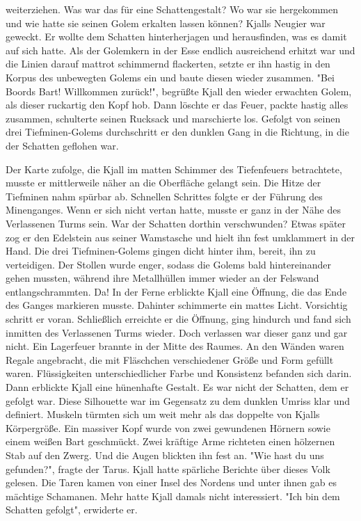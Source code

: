\documentclass[10pt, a4paper, oneside]{book}
\begin{document}
\begin{multicols}{2}
weiterziehen. Was war das für eine Schattengestalt? Wo war sie hergekommen und wie hatte sie seinen Golem erkalten lassen können? Kjalls Neugier war geweckt. Er wollte dem Schatten hinterherjagen und herausfinden, was es damit auf sich hatte. Als der Golemkern in der Esse endlich ausreichend erhitzt war und die Linien darauf mattrot schimmernd flackerten, setzte er ihn hastig in den Korpus des unbewegten Golems ein und baute diesen wieder zusammen. "Bei Boords Bart! Willkommen zurück!", begrüßte Kjall den wieder erwachten Golem, als dieser ruckartig den Kopf hob. Dann löschte er das Feuer, packte hastig alles zusammen, schulterte seinen Rucksack und marschierte los. Gefolgt von seinen drei Tiefminen-Golems durchschritt er den dunklen Gang in die Richtung, in die der Schatten geflohen war.\bigskip

Der Karte zufolge, die Kjall im matten Schimmer des Tiefenfeuers betrachtete, musste er mittlerweile näher an die Oberfläche gelangt sein. Die Hitze der Tiefminen nahm spürbar ab. Schnellen Schrittes folgte er der Führung des Minenganges. Wenn er sich nicht vertan hatte, musste er ganz in der Nähe des Verlassenen Turms sein. War der Schatten dorthin verschwunden? Etwas später zog er den Edelstein aus seiner Wamstasche und hielt ihn fest umklammert in der Hand. Die drei Tiefminen-Golems gingen dicht hinter ihm, bereit, ihn zu verteidigen. Der Stollen wurde enger, sodass die Golems bald hintereinander gehen mussten, während ihre Metallhüllen immer wieder an der Felswand entlangschrammten. Da! In der Ferne erblickte Kjall eine Öffnung, die das Ende des Ganges markieren musste. Dahinter schimmerte ein mattes Licht. Vorsichtig schritt er voran. Schließlich erreichte er die Öffnung, ging hindurch und fand sich inmitten des Verlassenen Turms wieder. Doch verlassen war dieser ganz und gar nicht. Ein Lagerfeuer brannte in der Mitte des Raumes. An den Wänden waren Regale angebracht, die mit Fläschchen verschiedener Größe und Form gefüllt waren. Flüssigkeiten unterschiedlicher Farbe und Konsistenz befanden sich darin. Dann erblickte Kjall eine hünenhafte Gestalt. Es war nicht der Schatten, dem er gefolgt war. Diese Silhouette war im Gegensatz zu dem dunklen Umriss klar und definiert. Muskeln türmten sich um weit mehr als das doppelte von Kjalls Körpergröße. Ein massiver Kopf wurde von zwei gewundenen Hörnern sowie einem weißen Bart geschmückt. Zwei kräftige Arme richteten einen hölzernen Stab auf den Zwerg. Und die Augen blickten ihn fest an. "Wie hast du uns gefunden?", fragte der Tarus. Kjall hatte spärliche Berichte über dieses Volk gelesen. Die Taren kamen von einer Insel des Nordens und unter ihnen gab es mächtige Schamanen. Mehr hatte Kjall damals nicht interessiert. "Ich bin dem Schatten gefolgt", erwiderte er.\bigskip


\end{multicols}
\end{document}
